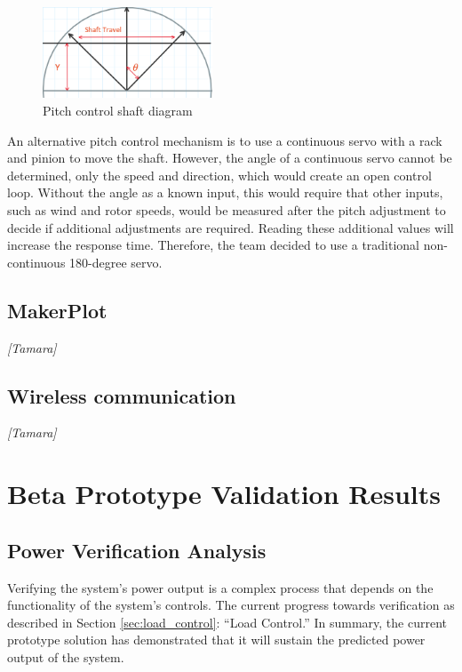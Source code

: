 \documentclass[11pt,letterpaper,conference]{IEEEtran}
\begin{document}
\begin{figure}[th]
    \centering
    \includegraphics[width=0.45\textwidth]{images/pitch_control.png}
    \caption{Pitch control shaft diagram}
    \label{img:pitch_control}
\end{figure}

An alternative pitch control mechanism is to use a continuous servo with a rack
and pinion to move the shaft. However, the angle of a continuous servo cannot
be determined, only the speed and direction, which would create an open control
loop. Without the angle as a known input, this would require that other inputs,
such as wind and rotor speeds, would be measured after the pitch adjustment to
decide if additional adjustments are required. Reading these additional values
will increase the response time. Therefore, the team decided to use a
traditional non-continuous 180-degree servo.

\subsection{MakerPlot}

\emph{[Tamara]}

\subsection{Wireless communication}

\emph{[Tamara]}

\section{Beta Prototype Validation Results}
\subsection{Power Verification Analysis}

Verifying the system's power output is a complex process that depends on the
functionality of the system's controls. The current progress towards
verification as described in Section \ref{sec:load_control}: ``Load Control.''
In summary, the current prototype solution has demonstrated that it will
sustain the predicted power output of the system.
\end{document}
